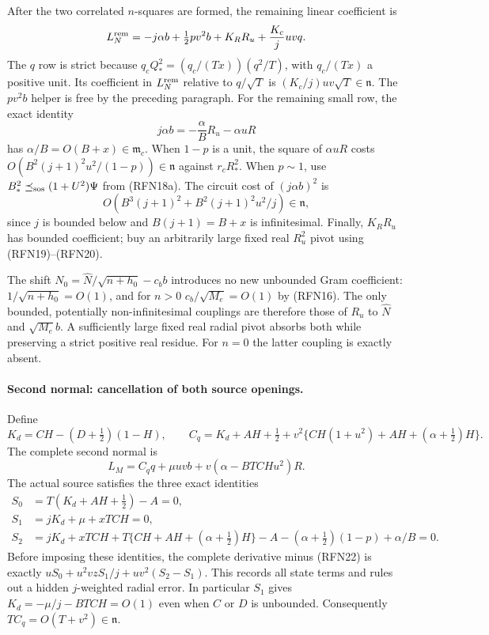 After the two correlated $n$-squares are formed, the remaining linear
coefficient is
\[
 L_N^{\rm rem}=-j\alpha b+\tfrac12pv^2b
                       +K_RR_u+\frac{K_c}{j}uvq.
\]
The $q$ row is strict because
$q_cQ_*^2=(q_c/(Tx))(q^2/T)$, with $q_c/(Tx)$ a positive unit.
Its coefficient in $L_N^{\rm rem}$ relative to $q/\sqrt T$ is
$(K_c/j)uv\sqrt T\in\mathfrak n$.
The $pv^2b$ helper is free by the preceding paragraph.
For the remaining small row, the exact identity
\[
 j\alpha b=-\frac\alpha B R_u-\alpha uR
\]
has $\alpha/B=O(B+x)\in\mathfrak m_c$.
When $1-p$ is a unit, the square of $\alpha uR$ costs
$O(B^2(j+1)^2u^2/(1-p))\in\mathfrak n$ against $r_cR_*^2$.
When $p\sim1$, use $B_*^2\preceq_{\rm sos}(1+U^2)\Psi$ from
(RFN18a).  The circuit cost of $(j\alpha b)^2$ is
\[
 O\!\left(B^3(j+1)^2+B^2(j+1)^2u^2/j\right)\in\mathfrak n,
\]
since $j$ is bounded below and $B(j+1)=B+x$ is infinitesimal.
Finally, $K_RR_u$ has bounded coefficient; buy an arbitrarily large
fixed real $R_u^2$ pivot using (RFN19)--(RFN20).

The shift $N_0=\widehat N/\sqrt{n+h_0}-c_bb$ introduces no new
unbounded Gram coefficient: $1/\sqrt{n+h_0}=O(1)$, and for $n>0$
$c_b/\sqrt{M_e}=O(1)$ by (RFN16).  The only bounded, potentially
non-infinitesimal couplings are therefore those of $R_u$ to
$\widehat N$ and $\sqrt{M_e}b$.  A sufficiently large fixed real radial
pivot absorbs both while preserving a strict positive real residue.
For $n=0$ the latter coupling is exactly absent.

\paragraph{Second normal: cancellation of both source openings.}
Define
\[
 K_d=CH-(D+\tfrac12)(1-H),\qquad
 C_q=K_d+AH+\tfrac12
       +v^2\{CH(1+u^2)+AH+(\alpha+\tfrac12)H\}.
\]
The complete second normal is
\[
 L_M=C_q q+\mu uvb+v(\alpha-BTCHu^2)R.                  \tag{RFN22}
\]
The actual source satisfies the three exact identities
\[
\begin{split}
 S_0&=T(K_d+AH+\tfrac12)-A=0,\\
 S_1&=jK_d+\mu+xTCH=0,\\
 S_2&=jK_d+xTCH+T\{CH+AH+(\alpha+\tfrac12)H\}
          -A-(\alpha+\tfrac12)(1-p)+\alpha/B=0.
\end{split}
\]
Before imposing these identities, the complete derivative minus
(RFN22) is exactly
$uS_0+u^2vzS_1/j+uv^2(S_2-S_1)$.
This records all state terms and rules out a hidden $j$-weighted
radial error.  In particular $S_1$ gives
$K_d=-\mu/j-BTCH=O(1)$ even when $C$ or $D$ is unbounded.
Consequently $TC_q=O(T+v^2)\in\mathfrak n$.

